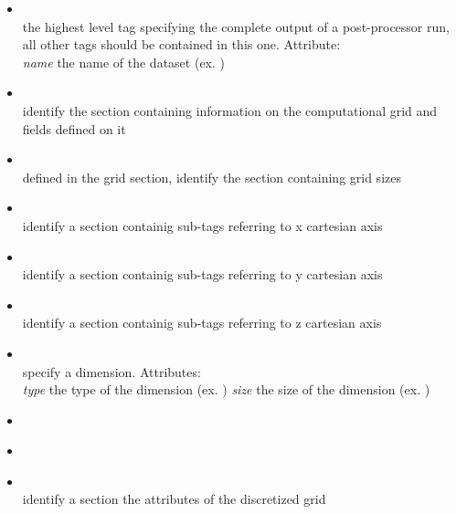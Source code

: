 \begin{itemize}

\item {} \\
      the highest level tag specifying the complete output of a post-processor run,
      all other tags should be contained in this one. Attribute:\\
      {\it name} the name of the dataset (ex. )

\item {} \\
      identify the section containing information on the computational grid and
      fields defined on it

\item {} \\
      defined in the grid section, identify the section containing grid sizes

\item {} \\
      identify a section containig sub-tags referring to x cartesian axis

\item {} \\
      identify a section containig sub-tags referring to y cartesian axis

\item {} \\
      identify a section containig sub-tags referring to z cartesian axis

\item {} \\
      specify a dimension. Attributes:\\
      {\it type} the type of the dimension (ex. )
      {\it size} the size of the dimension (ex. )

\item {} \\

\item {} \\

\item {} \\
      identify a section the attributes of the discretized grid


\end{itemize}
